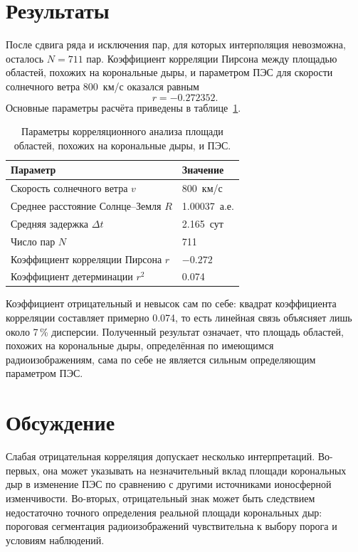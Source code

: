 \documentclass{article}
\begin{document}
\section{Результаты}

После сдвига ряда и исключения пар, для которых интерполяция невозможна,
осталось $N=711$ пар. Коэффициент корреляции Пирсона между площадью
областей, похожих на корональные дыры, и параметром ПЭС для скорости
солнечного ветра 800~км/с оказался равным
\begin{equation}
r = -0.272352.
\label{eq:result}
\end{equation}
Основные параметры расчёта приведены в таблице~\ref{tab:result}.

\begin{table}[t]
\centering
\caption{Параметры корреляционного анализа площади областей, похожих на
корональные дыры, и ПЭС.}
\label{tab:result}
\small
\setlength{\tabcolsep}{4pt}
\begin{tabular}{p{}l}
\toprule
Параметр & Значение \\
\midrule
Скорость солнечного ветра $v$ & 800~км/с \\
Среднее расстояние Солнце--Земля $R$ & 1.00037~а.е. \\
Средняя задержка $\Delta t$ & 2.165~сут \\
Число пар $N$ & 711 \\
Коэффициент корреляции Пирсона $r$ & $-0.272$ \\
Коэффициент детерминации $r^2$ & 0.074 \\
\bottomrule
\end{tabular}
\end{table}

Коэффициент отрицательный и невысок сам по себе: квадрат коэффициента
корреляции составляет примерно 0.074, то есть линейная связь объясняет лишь
около 7\,\% дисперсии. Полученный результат означает, что площадь областей,
похожих на корональные дыры, определённая по имеющимся радиоизображениям,
сама по себе не является сильным определяющим параметром ПЭС.

\section{Обсуждение}

Слабая отрицательная корреляция допускает несколько интерпретаций.
Во-первых, она может указывать на незначительный вклад площади корональных
дыр в изменение ПЭС по сравнению с другими источниками ионосферной
изменчивости. Во-вторых, отрицательный знак может быть следствием
недостаточно точного определения реальной площади корональных дыр: пороговая
сегментация радиоизображений чувствительна к выбору порога и условиям
наблюдений.
\end{document}
